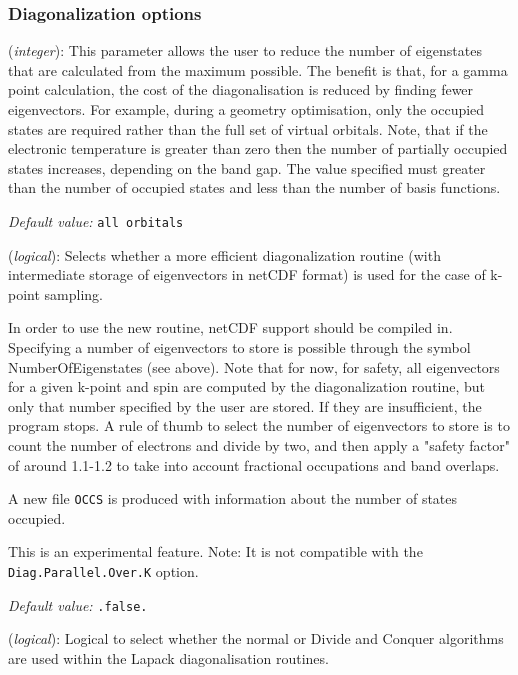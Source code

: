 \documentclass[11pt]{article}
\begin{document}
\subsubsection{Diagonalization options}
\begin{description}
\itemsep 10pt
\parsep 0pt

\item[{\bf NumberOfEigenStates}] ({\it integer}):
This parameter allows the user to reduce the number of eigenstates
that are calculated from the maximum possible. The benefit is that,
for a gamma point calculation, the cost of the diagonalisation is
reduced by finding fewer eigenvectors. For example, during a geometry
optimisation, only the occupied states are required rather than the
full set of virtual orbitals. Note, that if the electronic temperature
is greater than zero then the number of partially occupied states
increases, depending on the band gap.
The value specified must greater than the number of occupied states
and less than the number of basis functions.

{\it Default value:} {\tt all orbitals}

\item[{\bf Use.New.Diagk}] ({\it logical}):
Selects whether a more efficient diagonalization routine (with
intermediate storage of eigenvectors in netCDF format) is
used for the case of k-point sampling.

In order to use the new routine, netCDF support should be compiled in.
Specifying a number of eigenvectors to store is possible through
the symbol NumberOfEigenstates (see above). Note that for now, for safety, all
eigenvectors for a given k-point and spin are computed by the
diagonalization routine, but only that number specified by the user
are stored. If they are insufficient, the program stops.  A rule of
thumb to select the number of eigenvectors to store is to count the
number of electrons and divide by two, and then apply a "safety
factor" of around 1.1-1.2 to take into account fractional occupations
and band overlaps.

A new file {\tt OCCS} is produced with information about the number of
states occupied.

This is an experimental feature. Note: It is not compatible with the
{\tt Diag.Parallel.Over.K} option.

{\it Default value:} {\tt .false.}


\item[{\bf Diag.DivideAndConquer}] ({\it logical}):
Logical to select whether the normal or Divide and Conquer algorithms are
used within the Lapack diagonalisation routines.


\end{description}
\end{document}

